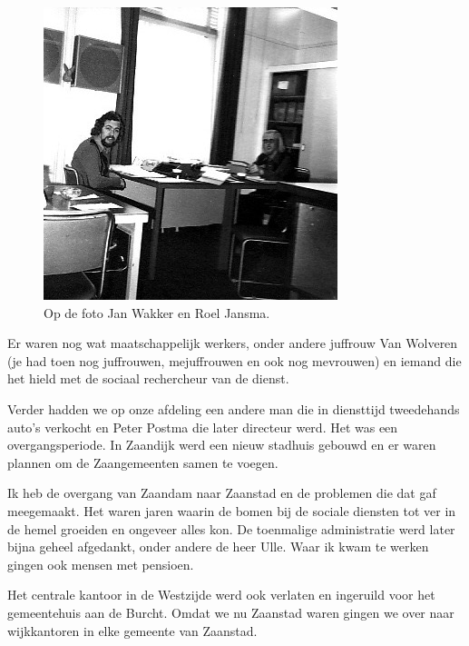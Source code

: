 \documentclass[12pt,twoside, openright]{memoir}
\begin{document}
\begin{figure}
\centering
\includegraphics[width=\textwidth]{img/ch42/soos01}
\caption*{\footnotesize Op de foto Jan Wakker en Roel Jansma.}
\end{figure}

Er waren nog wat maatschappelijk werkers, onder andere juffrouw Van Wolveren (je had toen nog juffrouwen, mejuffrouwen en ook nog mevrouwen) en iemand die het hield met de sociaal rechercheur van de dienst. 

Verder hadden we op onze afdeling een andere man die in diensttijd tweedehands auto’s verkocht en Peter Postma die later directeur werd. Het was een overgangsperiode. In Zaandijk werd een nieuw stadhuis gebouwd en er waren plannen om de Zaangemeenten samen te voegen.

Ik heb de overgang van Zaandam naar Zaanstad en de problemen die dat gaf meegemaakt. Het waren jaren waarin de bomen bij de sociale diensten tot ver in de hemel groeiden en ongeveer alles kon. De toenmalige administratie werd later bijna geheel afgedankt, onder andere de heer Ulle. Waar ik kwam te werken gingen ook mensen met pensioen.

Het centrale kantoor in de Westzijde werd ook verlaten en ingeruild voor het gemeentehuis aan de Burcht. Omdat we nu Zaanstad waren gingen we over naar wijkkantoren in elke gemeente van Zaanstad. 
\end{document}
